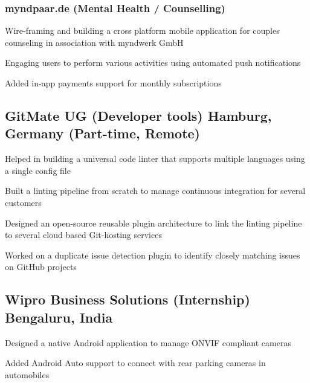 \documentclass[letter,10pt]{article}
\begin{document}
\subsubsection*{myndpaar.de (Mental Health / Counselling)}
\begin{zitemize}
\item Wire-framing and building a cross platform mobile application for couples counseling in association with myndwerk GmbH
\item Engaging users to perform various activities using automated push notifications
\item Added in-app payments support for monthly subscriptions
\end{zitemize}

\newpage


\subsection{GitMate UG (Developer tools) \hfill Hamburg, Germany (Part-time, Remote)}
\begin{zitemize}
\item Helped in building a universal code linter that supports multiple languages using a single config file
\item Built a linting pipeline from scratch to manage continuous integration for several customers
\item Designed an open-source reusable plugin architecture to link the linting pipeline to several cloud based Git-hosting services
\item Worked on a duplicate issue detection plugin to identify closely matching issues on GitHub projects
\end{zitemize}


\subsection{Wipro Business Solutions (Internship) \hfill Bengaluru, India}
\begin{zitemize}
\item Designed a native Android application to manage ONVIF compliant cameras
\item Added Android Auto support to connect with rear parking cameras in automobiles
\end{zitemize}

\end{document}
